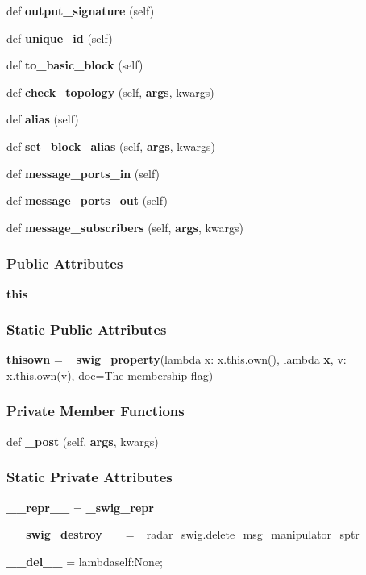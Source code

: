 \begin{DoxyCompactItemize}
def {\bf output\+\_\+signature} (self)
\item 
def {\bf unique\+\_\+id} (self)
\item 
def {\bf to\+\_\+basic\+\_\+block} (self)
\item 
def {\bf check\+\_\+topology} (self, {\bf args}, kwargs)
\item 
def {\bf alias} (self)
\item 
def {\bf set\+\_\+block\+\_\+alias} (self, {\bf args}, kwargs)
\item 
def {\bf message\+\_\+ports\+\_\+in} (self)
\item 
def {\bf message\+\_\+ports\+\_\+out} (self)
\item 
def {\bf message\+\_\+subscribers} (self, {\bf args}, kwargs)
\end{DoxyCompactItemize}
\subsubsection*{Public Attributes}
\begin{DoxyCompactItemize}
\item 
{\bf this}
\end{DoxyCompactItemize}
\subsubsection*{Static Public Attributes}
\begin{DoxyCompactItemize}
\item 
{\bf thisown} = {\bf \+\_\+swig\+\_\+property}(lambda x\+: x.\+this.\+own(), lambda {\bf x}, v\+: x.\+this.\+own(v), doc=\textquotesingle{}The membership flag\textquotesingle{})
\end{DoxyCompactItemize}
\subsubsection*{Private Member Functions}
\begin{DoxyCompactItemize}
\item 
def {\bf \+\_\+post} (self, {\bf args}, kwargs)
\end{DoxyCompactItemize}
\subsubsection*{Static Private Attributes}
\begin{DoxyCompactItemize}
\item 
{\bf \+\_\+\+\_\+repr\+\_\+\+\_\+} = {\bf \+\_\+swig\+\_\+repr}
\item 
{\bf \+\_\+\+\_\+swig\+\_\+destroy\+\_\+\+\_\+} = \+\_\+radar\+\_\+swig.\+delete\+\_\+msg\+\_\+manipulator\+\_\+sptr
\item 
{\bf \+\_\+\+\_\+del\+\_\+\+\_\+} = lambdaself\+:\+None;
\end{DoxyCompactItemize}


